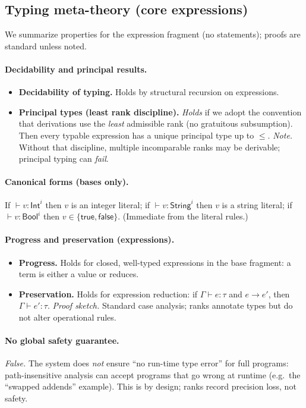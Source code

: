 \subsection{Typing meta-theory (core expressions)}
We summarize properties for the expression fragment (no statements); proofs are standard unless noted.

\paragraph{Decidability and principal results.}
\begin{itemize}
\item \textbf{Decidability of typing.} Holds by structural recursion on expressions.
\item \textbf{Principal types (least rank discipline).} 
\emph{Holds} if we adopt the convention that derivations use the \emph{least} admissible rank (no gratuitous subsumption).
Then every typable expression has a unique principal type up to $\le$.
\emph{Note.} Without that discipline, multiple incomparable ranks may be derivable; principal typing can \emph{fail}.
\end{itemize}

\paragraph{Canonical forms (bases only).}
If $\vdash v:\mathsf{Int}^{i}$ then $v$ is an integer literal;
if $\vdash v:\mathsf{String}^{i}$ then $v$ is a string literal;
if $\vdash v:\mathsf{Bool}^{i}$ then $v\in\{\mathsf{true},\mathsf{false}\}$.
(Immediate from the literal rules.)

\paragraph{Progress and preservation (expressions).}
\begin{itemize}
\item \textbf{Progress.} Holds for closed, well-typed expressions in the base fragment: a term is either a value or reduces.
\item \textbf{Preservation.} Holds for expression reduction: if $\Gamma\vdash e:\tau$ and $e\to e'$, then $\Gamma\vdash e':\tau$.
\emph{Proof sketch.} Standard case analysis; ranks annotate types but do not alter operational rules. 
\end{itemize}

\paragraph{No global safety guarantee.}
\emph{False.} The system does \emph{not} ensure ``no run-time type error'' for full programs:
path-insensitive analysis can accept programs that go wrong at runtime (e.g.\ the ``swapped addends'' example).
This is by design; ranks record precision loss, not safety.

